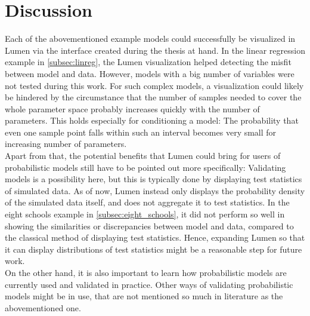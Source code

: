 \documentclass{article}
\begin{document}
 \section{Discussion}
Each of the abovementioned example models could successfully be visualized in Lumen via the interface created during the thesis at hand. In the linear regression example in \autoref{subsec:linreg}, the Lumen visualization helped detecting the misfit between model and data. However, models with a big number of variables were not tested during this work. For such complex models, a visualization could likely be hindered by the circumstance that the number of samples needed to cover the whole parameter space probably increases quickly with the number of parameters. This holds especially for conditioning a model: The probability that even one sample point falls within such an interval becomes very small for increasing number of parameters. 
\\
Apart from that, the potential benefits that Lumen could bring for users of probabilistic models still have to be pointed out more specifically: Validating models is a possibility here, but this is typically done by displaying test statistics of simulated data. As of now, Lumen instead only displays the probability density of the simulated data itself, and does not aggregate it to test statistics. In the eight schools example in \autoref{subsec:eight_schools}, it did not perform so well in showing the similarities or discrepancies between model and data, compared to the classical method of displaying test statistics. Hence, expanding Lumen so that it can display distributions of test statistics might be a reasonable step for future work.
\\
On the other hand, it is also important to learn how probabilistic models are currently used and validated in practice. Other ways of validating probabilistic models might be in use, that are not mentioned so much in literature as the abovementioned one.
\end{document}
